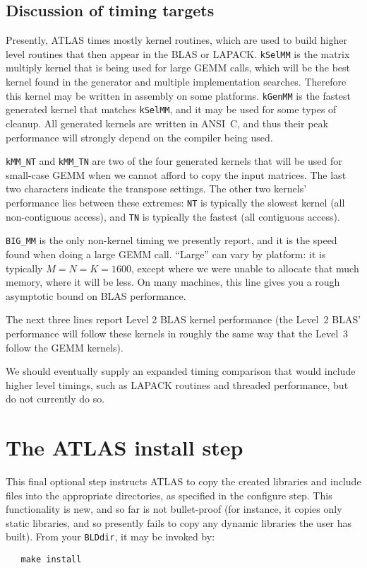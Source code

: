 \documentclass[11pt]{article}
\begin{document}
\subsection{Discussion of timing targets}
Presently, ATLAS times mostly kernel routines, which are used to build
higher level routines that then appear in the BLAS or LAPACK.
{\tt kSelMM} is the matrix multiply kernel that is being used for large
GEMM calls, which will be the best kernel found in the generator and
multiple implementation searches.  Therefore this kernel may be written
in assembly on some platforms.
{\tt kGenMM} is the fastest generated kernel that matches {\tt kSelMM},
and it may be used for some types of cleanup.  All generated kernels
are written in ANSI~C, and thus their peak performance will strongly
depend on the compiler being used.

{\tt kMM\_NT} and {\tt kMM\_TN} are two of the four generated kernels that
will be used for small-case GEMM when we cannot afford to copy the input
matrices.  The last two characters indicate the transpose settings.
The other two kernels' performance lies between these extremes:
{\tt NT} is typically the slowest kernel (all non-contiguous access),
and {\tt TN} is typically the fastest (all contiguous access).

{\tt BIG\_MM} is the only non-kernel timing we presently report, and it is
the speed found when doing a large GEMM call.  ``Large'' can vary by platform:
it is typically $M=N=K=1600$, except where we were unable to allocate that
much memory, where it will be less.  On many machines, this line gives you
a rough asymptotic bound on BLAS performance.

The next three lines report Level 2 BLAS kernel performance (the Level~2
BLAS' performance will follow these kernels in roughly the same way that
the Level~3 follow the GEMM kernels).

We should eventually supply an expanded timing comparison that would include
higher level timings, such as LAPACK routines and threaded performance,
but do not currently do so.

\section{The ATLAS install step}
\label{sec-install-step}
This final optional step instructs ATLAS to copy the created libraries
and include files into the appropriate directories, as specified in
the configure step.  This functionality is new, and so far
is not bullet-proof (for instance, it copies only static libraries,
and so presently fails to copy any dynamic libraries the user has built).
From your {\tt BLDdir}, it may be invoked by:
\vspace*{-0.1in}
\begin{verbatim}
   make install
\end{verbatim}
\end{document}
